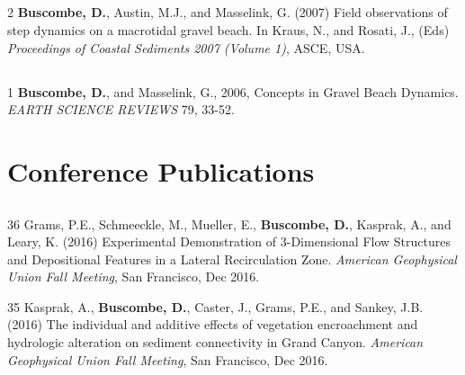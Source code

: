 \documentclass[margin,line]{resume}
\begin{document}
\begin{resume}
\begin{footnotesize}
\begin{list1}
	\end{list1}

	\subsection{}
	\begin{list1}
	\item[2] {\bf Buscombe, D.}, Austin, M.J., and Masselink, G. (2007) Field observations of step dynamics on a macrotidal gravel beach. In Kraus, N., and Rosati, J., (Eds) {\sl Proceedings of Coastal Sediments 2007 (Volume 1)}, ASCE, USA.
	\end{list1}

	\subsection{}
	\begin{list1}
	\item[1] {\bf Buscombe, D.}, and Masselink, G., 2006, Concepts in Gravel Beach Dynamics. {\sl EARTH SCIENCE REVIEWS} 79, 33-52.
	\end{list1}

        \end{footnotesize}

    \section{\mysidestyle Conference Publications}

        \begin{footnotesize}

	\subsection{}
	\begin{list1}
        \item[36] Grams, P.E., Schmeeckle, M., Mueller, E., {\bf Buscombe, D.}, Kasprak, A., and Leary, K. (2016) Experimental Demonstration of 3-Dimensional Flow Structures and Depositional Features in a Lateral Recirculation Zone. {\sl American Geophysical Union Fall Meeting}, San Francisco, Dec 2016.\\  

        \item[35] Kasprak, A., {\bf Buscombe, D.}, Caster, J., Grams, P.E., and Sankey, J.B. (2016) The individual and additive effects of vegetation encroachment and hydrologic alteration on sediment connectivity in Grand Canyon. {\sl American Geophysical Union Fall Meeting}, San Francisco, Dec 2016.\\  


\end{list1}
\end{footnotesize}
\end{resume}
\end{document}
